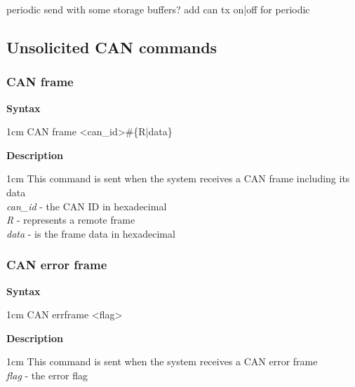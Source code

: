 \documentclass{article}[a4paper]
\begin{document}
periodic send with some storage buffers? add can tx {on|off} for periodic

\subsection{Unsolicited CAN commands}

\subsubsection{CAN frame}
\begin{tcolorbox}
	{\bf Syntax}

	 1cm \dimexpr\linewidth-2cm\relax
	CAN frame <can\_id>\#\{R|data\}

	\medskip
	{\bf Description}

	 1cm \dimexpr\linewidth-2cm\relax
	This command is sent when the system receives a CAN frame including its data
	\medskip \\
	{\it can\_id} - the CAN ID in hexadecimal \\
	{\it R} - represents a remote frame \\
	{\it data} - is the frame data in hexadecimal
\end{tcolorbox}

\subsubsection{CAN error frame}
\begin{tcolorbox}
	{\bf Syntax}

	 1cm \dimexpr\linewidth-2cm\relax
	CAN errframe <flag>

	\medskip
	{\bf Description}

	 1cm \dimexpr\linewidth-2cm\relax
	This command is sent when the system receives a CAN error frame
	\medskip \\
	{\it flag} - the error flag
\end{tcolorbox}



\begin{comment}

\section{LIN}
LIN commands
------------
LIN send <id>
LIN set txbuffer <n> <data>     - empty <data> disables TX buffer

Unsolicited commands:
LIN frame
error?

\end{comment}
\end{document}
